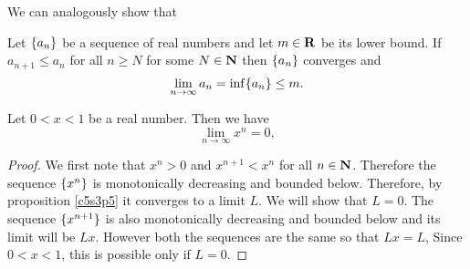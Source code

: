 We can analogously show that
\begin{prop}\label{c5s3p4}
Let $\{a_n\}$ be a sequence of real numbers and let $m \in \mathbf{R}$ be its
lower bound. If $a_{n+1} \le a_n$ for all $n \ge N$ for some $N \in \mathbf{N}$
then $\{a_n\}$ converges and
\[
\lim_{n \rightarrow \infty}a_n = \inf\{a_n\} \le m.
\]
\end{prop}

\begin{prop}\label{c5s3p5}
Let $0 < x < 1$ be a real number. Then we have
\[
\lim_{n \rightarrow \infty}x^n = 0,
\]
\end{prop}
\begin{proof}
We first note that $x^n > 0$ and $x^{n+1} < x^n$ for all $n \in \mathbf{N}$. 
Therefore the sequence $\{x^n\}$ is monotonically decreasing and bounded
below. Therefore, by proposition \ref{c5s3p5} it converges to a limit $L$.
We will show that $L = 0$. The sequence $\{x^{n+1}\}$ is also monotonically
decreasing and bounded below and its limit will be $Lx$. However both the
sequences are the same so that $Lx = L$, Since $0 < x < 1$, this is possible
only if $L = 0$.
\end{proof}
